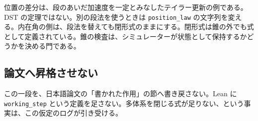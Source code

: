 位置の差分は、段のあいだ加速度を一定とみなしたテイラー更新の例である。DST の定理ではない。別の段法を使うときは \texttt{position\_law} の文字列を変える。内在角の側は、段法を替えても閉形式のままにする。閉形式は錐の外でも式として定義されている。錐の検査は、シミュレーターが状態として保持するかどうかを決める門である。

\subsection{論文へ昇格させない}

この一段を、日本語論文の「書かれた作用」の節へ書き戻さない。Lean に \texttt{working\_step} という定義を足さない。多体系を閉じる式が足りない、という事実は、この仮定のログが引き受ける。
